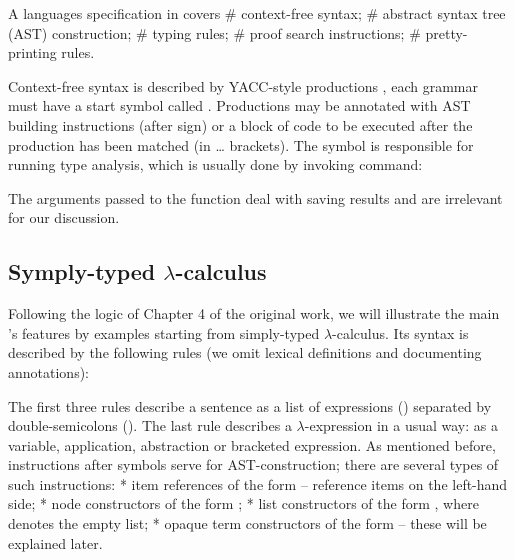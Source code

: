
A languages specification in \Tcg{} covers 
 # context-free syntax;
 # abstract syntax tree (AST) construction;
 # typing rules;
 # proof search instructions;
 # pretty-printing rules.

Context-free syntax is described by YACC-style productions \cite{YACC}, each grammar must have a start symbol called . Productions may be annotated with AST building instructions (after \code{-->} sign) or a block of code to be executed after the production has been matched (in \code{\{!} \ldots \code{!\}} brackets). The  symbol is responsible for running type analysis, which is usually done by invoking  command:


The arguments passed to the  function deal with saving results and are irrelevant for our discussion.

\subsection{Symply-typed $\lambda$-calculus}

Following the logic of Chapter 4 of the original work, we will illustrate the main \Tcg{}'s features by examples starting from simply-typed $\lambda$-calculus. Its syntax is described by the following rules (we omit lexical definitions and documenting annotations):


The first three rules describe a sentence as a list of expressions () separated by double-semicolons (). The last rule describes a $\lambda$-expression in a usual way: as a variable, application, abstraction or bracketed expression. As mentioned before, instructions after \code{-->} symbols serve for AST-construction; there are several types of such instructions:
 * item references of the form  -- reference items on the left-hand side;
 * node constructors of the form ;
 * list constructors of the form , where \code{[]} denotes the empty list;
 * opaque term constructors of the form  -- these will be explained later.

